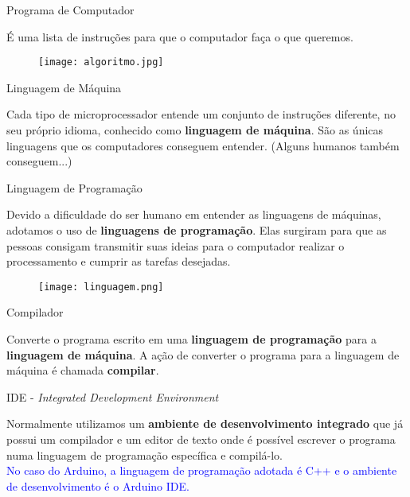 \begin{frame}{Programa de Computador}
	\begin{block}{}
		É uma lista de instruções para que o computador faça o que queremos.
	\end{block}
	
	\begin{figure}[H]
		\texttt{[image: algoritmo.jpg]}\footnotemark
	\end{figure}
	
\end{frame}

\begin{frame}{Linguagem de Máquina}
	\begin{block}{}
		Cada tipo de microprocessador entende um conjunto de instruções diferente, no seu próprio idioma, conhecido como \textbf{linguagem de máquina}. São as únicas linguagens que os computadores conseguem entender. (Alguns humanos também conseguem...)
	\end{block}
\end{frame}

\begin{frame}{Linguagem de Programação}
	\begin{block}{}
		Devido a dificuldade do ser humano em entender as linguagens de máquinas, adotamos o uso de \textbf{linguagens de programação}. Elas surgiram para que as pessoas consigam transmitir suas ideias para o computador realizar o processamento e cumprir as tarefas desejadas.  
	\end{block}
	
	\begin{figure}[H]
		\texttt{[image: linguagem.png]}\footnotemark
	\end{figure}
	
\end{frame}

\begin{frame}{Compilador}
	\begin{block}{}
		Converte o programa escrito em uma \textbf{linguagem de programação} para a \textbf{linguagem de máquina}. A ação de converter o programa para a linguagem de máquina é chamada \textbf{compilar}.
	\end{block}
\end{frame}

\begin{frame}{IDE - \textit{Integrated Development Environment}}
	\begin{block}{}
		Normalmente utilizamos um \textbf{ambiente de desenvolvimento integrado} que já possui um compilador e um editor de texto onde é possível escrever o programa numa linguagem de programação específica e compilá-lo.\\
		\vspace{2 em}
		\textcolor{blue}{No caso do Arduino, a linguagem de programação adotada é C++ e o ambiente de desenvolvimento é o Arduino IDE.}
	\end{block}
\end{frame}

